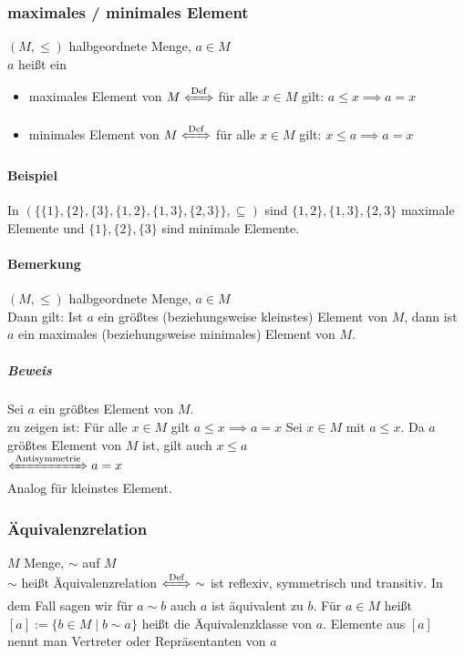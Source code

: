 \documentclass[a4paper]{scrartcl}
\theoremstyle{definition}
\theoremstyle{plain}
\theoremstyle{plain}
\theoremstyle{remark}
\theoremstyle{remark}
\theoremstyle{remark}
\theoremstyle{remark}
\theoremstyle{remark}
\begin{document}
\subsubsection{maximales / minimales Element}
\label{sec-2-5-5}
$(M,\leq)$ halbgeordnete Menge, $a\in M$ \\
    $a$ heißt ein
\begin{itemize}
\item maximales Element von $M \xLeftrightarrow{\text{Def}}$ für alle $x\in M$ gilt: $a\leq x \implies a = x$
\item minimales Element von $M \xLeftrightarrow{\text{Def}}$ für alle $x\in M$ gilt: $x\leq a \implies a = x$
\end{itemize}
\paragraph{Beispiel}
\label{sec-2-5-5-1}
In $(\{\{1\},\{2\},\{3\},\{1,2\},\{1,3\},\{2,3\}\}, \subseteq)$ sind $\{1,2\},\{1,3\},\{2,3\}$ maximale Elemente und $\{1\},\{2\},\{3\}$ sind minimale Elemente.
\paragraph{Bemerkung}
\label{sec-2-5-5-2}
$(M,\leq)$ halbgeordnete Menge, $a\in M$ \\
     Dann gilt: Ist $a$ ein größtes (beziehungsweise kleinstes) Element von $M$, dann ist $a$ ein maximales (beziehungsweise minimales) Element von $M$.
\subparagraph{Beweis}
\label{sec-2-5-5-2-1}
Sei $a$ ein größtes Element von $M$. \\
      zu zeigen ist: Für alle $x\in M$ gilt $a\leq x \implies a = x$
Sei $x\in M$ mit $a\leq x$. Da $a$ größtes Element von $M$ ist, gilt auch $x\leq a$ \\
      $\xLeftrightarrow{\text{Antisymmetrie}} a = x$ \\
      Analog für kleinstes Element.
\subsubsection{Äquivalenzrelation}
\label{sec-2-5-6}
$M$ Menge, $\sim$ auf $M$ \\
    $\sim$ heißt Äquivalenzrelation $\xLeftrightarrow{\text{Def}}~\sim$ ist reflexiv, symmetrisch und transitiv.
In dem Fall sagen wir für $a\sim b$ auch $a$ ist äquivalent zu $b$. Für $a\in M$ heißt $[a]:=\{b\in M \mid b\sim a\}$ heißt die Äquivalenzklasse von $a$.
Elemente aus $[a]$ nennt man Vertreter oder Repräsentanten von $a$
\end{document}
